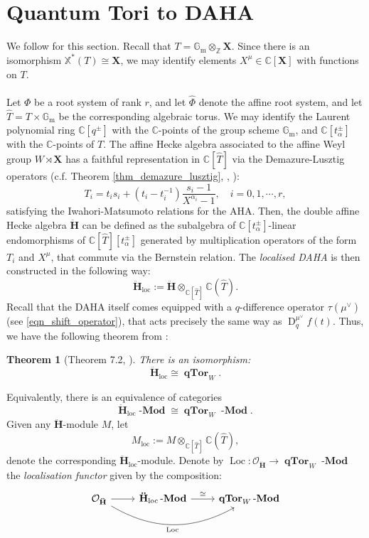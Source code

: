 \documentclass[a4paper]{report}
\newtheorem{theorem}{Theorem}
\theoremstyle{theorem}
\theoremstyle{definition}
\theoremstyle{remark}
\theoremstyle{proposition}
\theoremstyle{conjecture}
\theoremstyle{lemma}
\theoremstyle{corollary}
\theoremstyle{exercise}
\theoremstyle{example}
\newcommand{\C}{\mathbb{C}}
\newcommand{\mcal}{\mathcal}
\newcommand{\on}{\operatorname}
\newcommand{\lmod}{\on{\mathbf{-Mod}}}
\newcommand{\qTor}{\on{\mathbf{qTor}}}
\begin{document}
  \section{Quantum Tori to DAHA}
  
  We follow \cite[\S 6]{beg00} for this section. 
  Recall that $T = \mathbb{G}_{\on{m}}\otimes_{\mathbb{Z}} \mathbf{X}$. 
  Since there is an isomorphism $\mathbb{X}^\ast(T) \cong \mathbf{X}$, 
  we may identify elements
  $X^\mu \in \C[\mathbf{X}]$ with functions on $T$.\\\\
  Let $\Phi$ be a root system of rank $r$, and let $\widehat{\Phi}$ 
  denote the affine root system, and let 
  $\widehat{T} = T \times \mathbb{G}_{\on{m}}$ be the corresponding 
  algebraic torus. We may identify the Laurent polynomial ring $\C[q^\pm]$
  with the $\C$-points of the group scheme $\mathbb{G}_{\on{m}}$, and 
  $\C[t_\alpha^\pm]$ with the $\C$-points of $T$. The affine Hecke algebra
   associated to the affine Weyl group $W \rtimes \mathbf{X}$ has a 
   faithful representation in $\C[\widehat{T}]$ via the Demazure-Lusztig
   operators  (c.f. Theorem \ref{thm_demazure_lusztig}, \cite[Theorem 4.3]{kir97},
   \cite[(6.1)]{beg00}):
   $$T_i = t_i s_i + (t_i-t_i^{-1})\frac{s_i-1}{X^{\alpha_i} - 1},\quad i = 0,1,\cdots, r,$$
  satisfying the Iwahori-Matsumoto relations for the AHA. Then, the 
  double affine Hecke algebra $\mathbf{\ddot{\mathbf{H}}}$ can be defined as the 
  subalgebra of $\C[t_\alpha^\pm]$-linear endomorphisms of 
  $\C[\widehat{T}][t_\alpha^\pm]$ generated by multiplication operators 
  of the form $T_i$ and $X^\mu$, that commute via the Bernstein relation.
  The \emph{localised DAHA} is then constructed in the following way:
  $$\mathbf{\ddot{\mathbf{H}}}_{\on{loc}} := \ddot{\mathbf{H}} \otimes_{\C[\widehat{T}]} \C(\widehat{T}).$$
  Recall that the DAHA itself comes equipped with a $q$-difference operator 
  $\tau(\mu^\vee)$ (see \eqref{eqn_shift_operator}), that acts 
  precisely the same way as $\on{D}_q^{\mu^\vee}f(t)$. 
  Thus, we have the following theorem from \cite{beg00}:
  \begin{theorem}[Theorem 7.2, \cite{beg00}]
      There is an isomorphism:
      $$\mathbf{\ddot{\mathbf{H}}}_{\on{loc}} \cong \qTor_W.$$
  \end{theorem}
  Equivalently, there is an equivalence of categories 
  $$\mathbf{\ddot{\mathbf{H}}}_{\on{loc}}\lmod \cong \qTor_W\lmod.$$
  Given any $\mathbf{\ddot{\mathbf{H}}}$-module $M$, let 
  $$M_{\on{loc}} := M \otimes_{\C[\widehat{T}]} \C(\widehat{T}),$$ denote the corresponding 
  $\mathbf{\ddot{\mathbf{H}}}_{\on{loc}}$-module. Denote by $\on{Loc} : \mcal{O}_{\ddot{\mathbf{H}}} \to \qTor_W\lmod$ 
  the \emph{localisation functor} given by the composition:
  $$\begin{tikzcd}
      \mathcal{O}_{\mathbf{\ddot{\mathbf{H}}}} \arrow[r] \arrow[rr, "\operatorname{Loc}"', bend right] & \mathbf{\ddot{\mathbf{H}}}_{\operatorname{loc}}\lmod \arrow[r, "\cong"] & \qTor_W\lmod
  \end{tikzcd}$$
  
\end{document}
